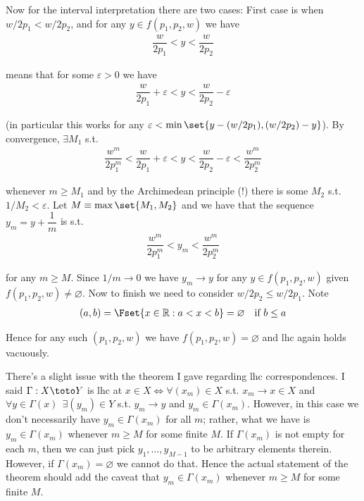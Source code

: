 \documentclass{article}
\begin{document}
\begin{enumerate}[1.]
\begin{enumerate}
        Now for the interval interpretation there are two cases: First case is when $w/2p_1 < w/2p_2$, and for any $y \in f(p_1, p_2, w)$ we have
        \begin{align*}
          \dfrac{w}{2 p_1} < y < \dfrac{w}{2 p_2}
        \end{align*}

        means that  for some $\varepsilon > 0$ we have
        \begin{align*}
          \dfrac{w}{2 p_1} + \varepsilon < y < \dfrac{w}{2 p_2} - \varepsilon
        \end{align*}

        (in particular this works for any $\varepsilon < \min\set{y - (w / 2p_1), (w/2p_2) - y}$). By convergence, $\exists M_1$ s.t.
        \begin{align*}
          \dfrac{w^m}{2 p_1^m} < \dfrac{w}{2 p_1} + \varepsilon
          < 
          y 
          <
          \dfrac{w}{2 p_2} - \varepsilon
          <
          \dfrac{w^m}{2 p_2^m}
        \end{align*}

        whenever $m \ge M_1$ and by the Archimedean principle (!) there is some $M_2$ s.t. $1 / M_2 < \varepsilon$. Let $M \equiv \max\set{M_1, M_2}$ and we have that the sequence $y_m = y + \dfrac{1}{m}$ is s.t.
        \begin{align*}
          \dfrac{w^m}{2 p_1^m}
          < 
          y_m
          <
          \dfrac{w^m}{2 p_2^m}
        \end{align*}

        for any $m \ge M$. Since $1/m \to 0$ we have $y_m \to y$ for any $y \in f(p_1, p_2, w)$ given $f(p_1, p_2, w) \ne \varnothing$. Now to finish we need to consider $w/2 p_2 \le w/2p_1$. Note
        \begin{align*}
          (a, b) = \Fset{x \in \mathbb{R}: a < x < b} = \varnothing \quad\text{if $b \le a$}
        \end{align*}

        Hence for any such $(p_1, p_2, w)$ we have $f(p_1, p_2, w) = \varnothing$ and lhc again holds vacuously.
    \end{enumerate}

    \begin{remark}
      There's a slight issue with the theorem I gave regarding lhc correspondences. I said $\Gamma: X \toto Y$ is lhc at $x \in X \iff \forall (x_m) \in X$ s.t. $x_m \to x \in X$ and $\forall y \in \Gamma(x) ~~ \exists (y_m) \in Y$ s.t. $y_m \to y$ and $y_m \in \Gamma(x_m)$. However, in this case we don't necessarily have $y_m \in \Gamma(x_m)$ for all $m$; rather, what we have is $y_m \in \Gamma(x_m)$ whenever $m \ge M$ for some finite $M$. If $\Gamma(x_m)$ is not empty for each $m$, then we can just pick $y_1, \ldots, y_{M - 1}$ to be arbitrary elements therein. However, if $\Gamma(x_m) = \varnothing$ we cannot  do that. Hence the actual statement of the theorem should add the caveat that $y_m \in \Gamma(x_m)$ whenever $m \ge M$ for some finite $M$.
    \end{remark}
\end{enumerate}

\end{document}
